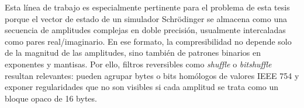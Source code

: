 Esta línea de trabajo es especialmente pertinente para el problema de esta tesis porque
el vector de estado de un simulador Schr\"odinger se almacena como una secuencia de
amplitudes complejas en doble precisión, usualmente intercaladas como pares
real/imaginario. En ese formato, la compresibilidad no depende solo de la magnitud de
las amplitudes, sino también de patrones binarios en exponentes y mantisas. Por ello,
filtros reversibles como \emph{shuffle} o \emph{bitshuffle} resultan relevantes: pueden
agrupar bytes o bits homólogos de valores IEEE 754 y exponer regularidades que no son
visibles si cada amplitud se trata como un bloque opaco de 16 bytes.
